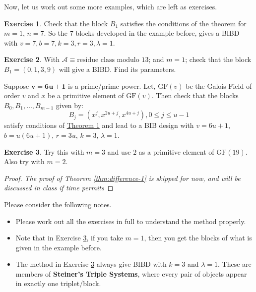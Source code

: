 \documentclass[12pt]{article}
\theoremstyle{definition}
\newtheorem{ex}{Exercise}
\newenvironment{note}{
\begin{tcolorbox}[colback=blue!5!white,colframe=blue!75!black,title=Note, parbox = false] }{\end{tcolorbox} }
\newenvironment{example}[1][\unskip]{
\begin{tcolorbox}[colback=blue!5!white,colframe=blue!75!black, title = {Example #1}, parbox = false] }{\end{tcolorbox} }
\newenvironment{exercise}{
\begin{tcolorbox}[colback=red!5!white,colframe=red!75!black, parbox = false]\begin{ex} }{\end{ex}\end{tcolorbox} }
\begin{document}
Now, let us work out some more examples, which are left as exercises.

\begin{exercise}
	Check that the block $B_1$ satisfies the conditions of the theorem for $m = 1$, $n = 7$. So the $7$ blocks developed in the example before, gives a BIBD with $v = 7, b = 7, k = 3, r = 3, \lambda = 1$.
\end{exercise}

\begin{exercise}
	With $\mathcal{A} \equiv \text{residue class modulo $13$}$; and $m = 1$; check that the block $B_1 = (0, 1, 3, 9)$ will give a BIBD. Find its parameters.
\end{exercise}

\begin{example}
	Suppose $\bm{v = 6u+1}$ is a prime/prime power. Let, $\text{GF}(v)$ be the Galois Field of order $v$ and $x$ be a primitive element of $\text{GF}(v)$. Then check that the blocks $B_0, B_1, \ldots, B_{m-1}$ given by: 
	$$ B_j = (x^j, x^{2u+j}, x^{4u+j}), 0 \leq j \leq u-1 $$ satisfy conditions of \hyperref[thm:difference-1]{Theorem 1} and lead to a BIB design with $v=6u+1$, $b=u(6u+1)$, $r=3u$, $k=3$, $\lambda=1$.
	
	\begin{exercise}
	    Try this with $m = 3$ and use $2$ as a primitive element of $\text{GF}(19)$. Also try with $m = 2$.
	    \label{ex-3}
	\end{exercise}
\end{example}

\begin{proof}
	\textit{The proof of Theorem \ref{thm:difference-1} is skipped for now, and will be discussed in class if time permits}
\end{proof}

Please consider the following notes.

\begin{note}
	\begin{itemize}
		\item Please work out all the exercises in full to understand the method properly.
		\item Note that in Exercise \ref{ex-3}, if you take $m = 1$, then you get the blocks of what is given in the example before. 
		\item  The method in Exercise \ref{ex-3} always give BIBD with $k = 3$ and $\lambda = 1$. These are members of \textbf{Steiner's Triple Systems}, where every pair of objects appear in exactly one triplet/block.
	\end{itemize}
\end{note}
\end{document}
